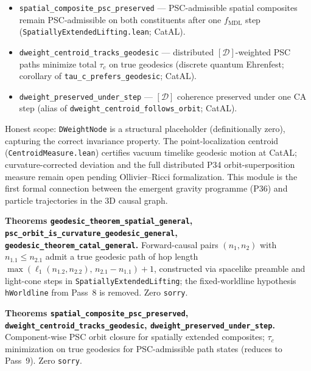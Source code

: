 \documentclass[11pt,a4paper]{article}
\newenvironment{keybox}[1]{%
  \Needspace*{8\baselineskip}%
  \begin{tcolorbox}[
    enhanced,
    breakable=false,
    colback=blue!5,
    colframe=blue!45!black,
    coltitle=black,
    colbacktitle=blue!14,
    boxrule=0.85pt,
    arc=2.5pt,
    left=9pt, right=9pt, top=6pt, bottom=6pt,
    titlerule=0.55pt,
    fonttitle=\bfseries,
    title={#1},
    before upper=\raggedright,
    before skip=0.9\baselineskip,
    after skip=0.9\baselineskip
  ]%
}{%
  \end{tcolorbox}%
}
\theoremstyle{definition}
\begin{document}
\begin{itemize}[nosep]
  for general endpoints including positive $\mathtt{DWeightPath}$ (CatAL).
\item \lstinline|spatial_composite_psc_preserved| --- PSC-admissible spatial
  composites remain PSC-admissible on both constituents after one
  $f_{\mathrm{MDL}}$ step (\texttt{SpatiallyExtendedLifting.lean}; CatAL).
\item \lstinline|dweight_centroid_tracks_geodesic| --- distributed
  $[\mathcal{D}]$-weighted PSC paths minimize total $\tau_c$ on true geodesics
  (discrete quantum Ehrenfest; corollary of \lstinline|tau_c_prefers_geodesic|;
  CatAL).
\item \lstinline|dweight_preserved_under_step| --- $[\mathcal{D}]$ coherence
  preserved under one CA step (alias of \lstinline|dweight_centroid_follows_orbit|;
  CatAL).
\end{itemize}

Honest scope: \lstinline|DWeightNode| is a structural placeholder (definitionally
zero), capturing the correct invariance property.  The point-localization centroid
(\texttt{CentroidMeasure.lean}) certifies vacuum timelike geodesic motion at CatAL;
curvature-corrected deviation and the full distributed P34 orbit-superposition
measure remain open pending Ollivier--Ricci formalization.
This module is the first formal connection between the emergent gravity programme
(P36) and particle trajectories in the 3D causal graph.

\begin{keybox}{Pass~10: spatial displacement geodesics (M4, CatAL)}
\textbf{Theorems \lstinline|geodesic_theorem_spatial_general|,
\lstinline|psc_orbit_is_curvature_geodesic_general|,
\lstinline|geodesic_theorem_catal_general|.}
Forward-causal pairs $(n_1,n_2)$ with $n_1.1 \leq n_2.1$ admit a true geodesic
path of hop length $\max(\ell_1(n_1.2,n_2.2),\, n_2.1 - n_1.1)+1$, constructed
via spacelike preamble and light-cone steps in \texttt{SpatiallyExtendedLifting};
the fixed-worldline hypothesis \lstinline|hWorldline| from Pass~8 is removed.
Zero \lstinline|sorry|.
\end{keybox}

\begin{keybox}{M4 closure: PSCPreserving + centroid Ehrenfest (CatAL)}
\textbf{Theorems \lstinline|spatial_composite_psc_preserved|,
\lstinline|dweight_centroid_tracks_geodesic|,
\lstinline|dweight_preserved_under_step|.}
Component-wise PSC orbit closure for spatially extended composites; $\tau_c$
minimization on true geodesics for PSC-admissible path states (reduces to
Pass~9). Zero \lstinline|sorry|.
\end{keybox}
\end{document}
